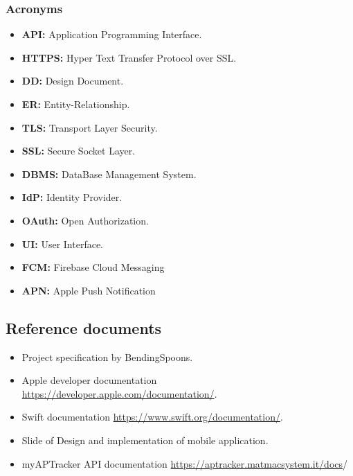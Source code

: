 \subsubsection{Acronyms}
\begin{itemize}
    \item \textbf{API:} Application Programming Interface.
    \item \textbf{HTTPS:} Hyper Text Transfer Protocol over SSL.
    \item \textbf{DD:} Design Document.
    \item \textbf{ER:} Entity-Relationship.
    \item \textbf{TLS:} Transport Layer Security.
    \item \textbf{SSL:} Secure Socket Layer.
    \item \textbf{DBMS:} DataBase Management System.
    \item \textbf{IdP:} Identity Provider.
    \item \textbf{OAuth:} Open Authorization.
    \item \textbf{UI:} User Interface.
    \item \textbf{FCM:} Firebase Cloud Messaging
    \item \textbf{APN:} Apple Push Notification
\end{itemize}

\subsection{Reference documents}
\begin{itemize}
    \item Project specification by BendingSpoons.
    \item Apple developer documentation \href{https://developer.apple.com/documentation/}{https://developer.apple.com/documentation/}.
    \item Swift documentation \href{https://www.swift.org/documentation/}{https://www.swift.org/documentation/}.
    \item Slide of Design and implementation of mobile application.
    \item myAPTracker API documentation \href{https://aptracker.matmacsystem.it/docs}{https://aptracker.matmacsystem.it/docs}/
\end{itemize}

